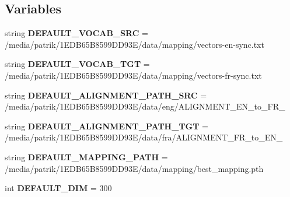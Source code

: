 \subsection*{Variables}
\begin{DoxyCompactItemize}
\item 
string {\bfseries D\+E\+F\+A\+U\+L\+T\+\_\+\+V\+O\+C\+A\+B\+\_\+\+S\+RC} = \textquotesingle{}/media/patrik/1\+E\+D\+B65\+B8599\+D\+D93\+E/data/mapping/vectors-\/en-\/sync.\+txt\textquotesingle{}\hypertarget{namespacealign__vocabs_a8e8635714c6a5fdd871c7f26357d2974}{}\label{namespacealign__vocabs_a8e8635714c6a5fdd871c7f26357d2974}

\item 
string {\bfseries D\+E\+F\+A\+U\+L\+T\+\_\+\+V\+O\+C\+A\+B\+\_\+\+T\+GT} = \textquotesingle{}/media/patrik/1\+E\+D\+B65\+B8599\+D\+D93\+E/data/mapping/vectors-\/fr-\/sync.\+txt\textquotesingle{}\hypertarget{namespacealign__vocabs_a1e9820251e058aa3b2b2138af12a5eec}{}\label{namespacealign__vocabs_a1e9820251e058aa3b2b2138af12a5eec}

\item 
string {\bfseries D\+E\+F\+A\+U\+L\+T\+\_\+\+A\+L\+I\+G\+N\+M\+E\+N\+T\+\_\+\+P\+A\+T\+H\+\_\+\+S\+RC} = \textquotesingle{}/media/patrik/1\+E\+D\+B65\+B8599\+D\+D93\+E/data/eng/\+A\+L\+I\+G\+N\+M\+E\+N\+T\+\_\+\+E\+N\+\_\+to\+\_\+\+F\+R\+\_\textquotesingle{}\hypertarget{namespacealign__vocabs_a0269090ff8001bb0fd1e2a14f5b46036}{}\label{namespacealign__vocabs_a0269090ff8001bb0fd1e2a14f5b46036}

\item 
string {\bfseries D\+E\+F\+A\+U\+L\+T\+\_\+\+A\+L\+I\+G\+N\+M\+E\+N\+T\+\_\+\+P\+A\+T\+H\+\_\+\+T\+GT} = \textquotesingle{}/media/patrik/1\+E\+D\+B65\+B8599\+D\+D93\+E/data/fra/\+A\+L\+I\+G\+N\+M\+E\+N\+T\+\_\+\+F\+R\+\_\+to\+\_\+\+E\+N\+\_\textquotesingle{}\hypertarget{namespacealign__vocabs_a0b7b72e995f3727342f38420053b5fe2}{}\label{namespacealign__vocabs_a0b7b72e995f3727342f38420053b5fe2}

\item 
string {\bfseries D\+E\+F\+A\+U\+L\+T\+\_\+\+M\+A\+P\+P\+I\+N\+G\+\_\+\+P\+A\+TH} = \textquotesingle{}/media/patrik/1\+E\+D\+B65\+B8599\+D\+D93\+E/data/mapping/best\+\_\+mapping.\+pth\textquotesingle{}\hypertarget{namespacealign__vocabs_a66f77571ba4c773ba7eab60779825b53}{}\label{namespacealign__vocabs_a66f77571ba4c773ba7eab60779825b53}

\item 
int {\bfseries D\+E\+F\+A\+U\+L\+T\+\_\+\+D\+IM} = 300\hypertarget{namespacealign__vocabs_a59aabce07b4d57a48e6e5e96a98af658}{}\label{namespacealign__vocabs_a59aabce07b4d57a48e6e5e96a98af658}


\end{DoxyCompactItemize}
